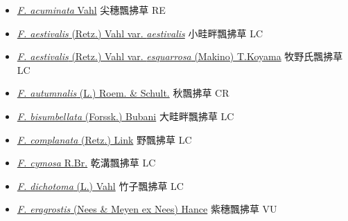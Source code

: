 \begin{itemize}
  \begin{itemize}
        \item[] \href{http://www.theplantlist.org/tpl1.1/search?q=Fimbristylis+acuminata}{\textit{F. acuminata} Vahl}   尖穗飄拂草 RE
        \item[] \href{http://www.theplantlist.org/tpl1.1/search?q=Fimbristylis+aestivalis+var.+aestivalis}{\textit{F. aestivalis} (Retz.) Vahl var. \textit{aestivalis}}   小畦畔飄拂草 LC
        \item[] \href{http://www.theplantlist.org/tpl1.1/search?q=Fimbristylis+aestivalis+var.+esquarrosa}{\textit{F. aestivalis} (Retz.) Vahl var. \textit{esquarrosa} (Makino) T.Koyama}   牧野氏飄拂草 LC
        \item[] \href{http://www.theplantlist.org/tpl1.1/search?q=Fimbristylis+autumnalis}{\textit{F. autumnalis} (L.) Roem. \& Schult.}   秋飄拂草 CR
        \item[] \href{http://www.theplantlist.org/tpl1.1/search?q=Fimbristylis+bisumbellata}{\textit{F. bisumbellata} (Forssk.) Bubani}   大畦畔飄拂草 LC
        \item[] \href{http://www.theplantlist.org/tpl1.1/search?q=Fimbristylis+complanata}{\textit{F. complanata} (Retz.) Link}   野飄拂草 LC
        \item[] \href{http://www.theplantlist.org/tpl1.1/search?q=Fimbristylis+cymosa}{\textit{F. cymosa} R.Br.}   乾溝飄拂草 LC
        \item[] \href{http://www.theplantlist.org/tpl1.1/search?q=Fimbristylis+dichotoma}{\textit{F. dichotoma} (L.) Vahl}   竹子飄拂草 LC
        \item[] \href{http://www.theplantlist.org/tpl1.1/search?q=Fimbristylis+eragrostis}{\textit{F. eragrostis} (Nees \& Meyen ex Nees) Hance}   紫穗飄拂草 VU

\end{itemize}
\end{itemize}
